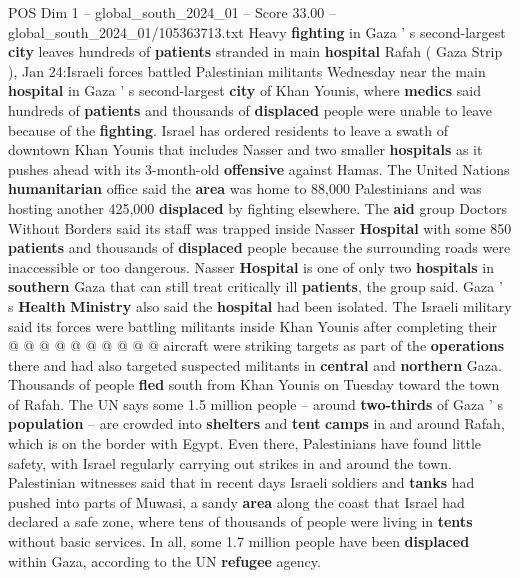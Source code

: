 \begin{textsample}{POS Dim 1 – global\_south\_2024\_01 – Score 33.00 – global\_south\_2024\_01/105363713.txt}  \label{ex:f1_pos_119}
Heavy \textbf{fighting} in Gaza ' s second-largest \textbf{city} leaves hundreds of \textbf{patients} stranded in main \textbf{hospital} Rafah ( Gaza Strip ), Jan 24:Israeli forces battled Palestinian militants Wednesday near the main \textbf{hospital} in Gaza ' s second-largest \textbf{city} of Khan Younis, where \textbf{medics} said hundreds of \textbf{patients} and thousands of \textbf{displaced} people were unable to leave because of the \textbf{fighting}.
Israel has ordered residents to leave a swath of downtown Khan Younis that includes Nasser and two smaller \textbf{hospitals} as it pushes ahead with its 3-month-old \textbf{offensive} against Hamas.
The United Nations \textbf{humanitarian} office said the \textbf{area} was home to 88,000 Palestinians and was hosting another 425,000 \textbf{displaced} by fighting elsewhere.
The \textbf{aid} group Doctors Without Borders said its staff was trapped inside Nasser \textbf{Hospital} with some 850 \textbf{patients} and thousands of \textbf{displaced} people because the surrounding roads were inaccessible or too dangerous.
Nasser \textbf{Hospital} is one of only two \textbf{hospitals} in \textbf{southern} Gaza that can still treat critically ill \textbf{patients}, the group said.
Gaza ' s \textbf{Health} \textbf{Ministry} also said the \textbf{hospital} had been isolated.
The Israeli military said its forces were battling militants inside Khan Younis after completing their @ @ @ @ @ @ @ @ @ @ aircraft were striking targets as part of the \textbf{operations} there and had also targeted suspected militants in \textbf{central} and \textbf{northern} Gaza.
Thousands of people \textbf{fled} south from Khan Younis on Tuesday toward the town of Rafah.
The UN says some 1.5 million people -- around \textbf{two-thirds} of Gaza ' s \textbf{population} -- are crowded into \textbf{shelters} and \textbf{tent} \textbf{camps} in and around Rafah, which is on the border with Egypt.
Even there, Palestinians have found little safety, with Israel regularly carrying out strikes in and around the town.
Palestinian witnesses said that in recent days Israeli soldiers and \textbf{tanks} had pushed into parts of Muwasi, a sandy \textbf{area} along the coast that Israel had declared a safe zone, where tens of thousands of people were living in \textbf{tents} without basic services.
In all, some 1.7 million people have been \textbf{displaced} within Gaza, according to the UN \textbf{refugee} agency.

\end{textsample}
